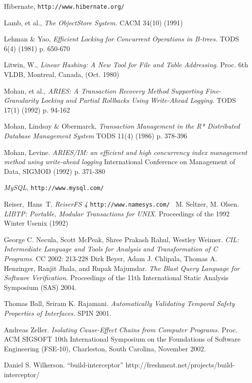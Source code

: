\documentclass[10pt,letterpaper,twocolumn,english]{article}
\begin{document}
\begin{thebibliography}{99}
\begin{small}
 Hibernate, {\tt http://www.hibernate.org/}

 Lamb, et al., {\em The ObjectStore System.} CACM 34(10) (1991)

 Lehman \& Yao, {\em Efficient Locking for Concurrent Operations in B-trees.} TODS 6(4) (1981) p. 650-670

 Litwin, W., {\em Linear Hashing: A New Tool for File and Table Addressing}. Proc. 6th VLDB, Montreal, Canada, (Oct. 1980) %

 Mohan, et al., {\em ARIES: A Transaction Recovery Method Supporting Fine-Granularity Locking and Partial Rollbacks Using Write-Ahead Logging.} TODS 17(1) (1992) p. 94-162

 Mohan, Lindsay \& Obermarck, {\em Transaction Management in the R* Distributed Database Management System} TODS 11(4) (1986) p. 378-396

 Mohan, Levine. {\em ARIES/IM: an efficient and high concurrency index management method using write-ahead logging} International Conference on Management of Data, SIGMOD (1992) p. 371-380

 {\em MySQL}, {\tt http://www.mysql.com/ }

 Reiser,~Hans~T. {\em ReiserFS 4} {\tt http://www.namesys.com/ }
%
 M. Seltzer, M. Olsen. {\em LIBTP: Portable, Modular Transactions for UNIX}. Proceedings of the 1992 Winter Usenix (1992)

 George C. Necula, Scott McPeak, Shree Prakash Rahul, Westley Weimer. {\em CIL: Intermediate Language and Tools for Analysis and Transformation of C Programs}. CC 2002: 213-228
 Dirk Beyer, Adam J. Chlipala, Thomas A. Henzinger, Ranjit Jhala, and Rupak Majumdar. {\em The Blast Query Language for Software Verification.} Proceedings of the 11th International Static Analysis Symposium (SAS) 2004.

 Thomas Ball, Sriram K. Rajamani.  {\em Automatically Validating Temporal Safety Properties of Interfaces.} SPIN 2001.

 Andreas Zeller. {\em Isolating Cause-Effect Chains from Computer Programs.} Proc. ACM SIGSOFT 10th International Symposium on the Foundations of Software Engineering (FSE-10), Charleston, South Carolina, November 2002.

 Daniel S. Wilkerson. ``build-interceptor'' http://freshmeat.net/projects/build-interceptor/


\end{small}
\end{thebibliography}
\end{document}
